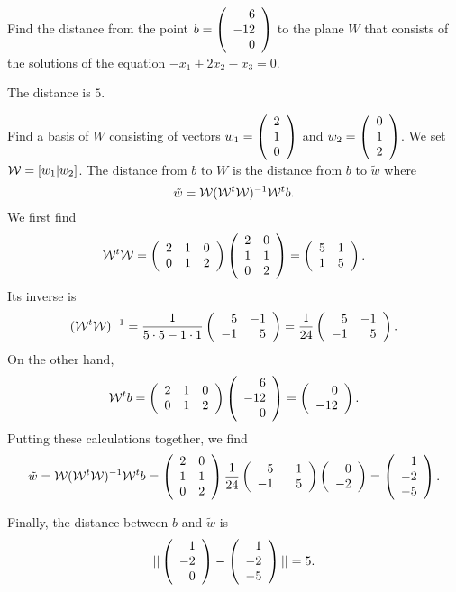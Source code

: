 \documentclass{ximera}
\begin{document}
\begin{exercise} \label{YZ_9.1.7}
Find the distance from the point $b=\Matrix{6\\-12\\0}$ to the plane $W$ that consists of the solutions of the equation $-x_1 + 2x_2 -x_3 =0$.
\begin{solution}

\ans The distance is $5$.

\soln Find a basis of $W$ consisting of vectors $w_1=\Matrix{2\\1\\0}$ and $w_2=\Matrix{0\\1\\2}$. We set $\WW=[w_1|w_2]$. The distance from $b$ to $W$ is the distance from $b$ to $\tilde{w}$ where
\[
\tilde{w}=\WW(\WW^t\WW)^{-1}\WW^tb.
\]
We first find
\[
\WW^t\WW=\Matrix{2&1&0\\0&1&2}\Matrix{2&0\\1&1\\0&2}=\Matrix{5 &1 \\1 &5}.
\]
Its inverse is 
\[
(\WW^t\WW)^{-1}=\frac{1}{5\cdot 5-1\cdot 1}\Matrix{5 &-1\\
-1 &5}=\frac{1}{24}\Matrix{5 &-1\\-1 &5}.
\]
On the other hand,
\[
\WW^tb=\Matrix{2&1&0\\0&1&2}\Matrix{6\\-12\\0}=\Matrix{0\\-12}.
\]
Putting these calculations together, we find 
\[
\tilde{w}=\WW(\WW^t\WW)^{-1}\WW^tb=\Matrix{2&0\\1&1\\0&2}\frac{1}{24}\Matrix{5 &-1\\-1 &5}\Matrix{0\\-2}=\Matrix{1\\-2\\-5}.
\]

Finally, the distance between $b$ and $\tilde{w}$ is 
\[
||\Matrix{1\\-2\\0}-\Matrix{1\\-2\\-5}||=5.
\]
\end{solution}

\end{exercise}
\end{document}
